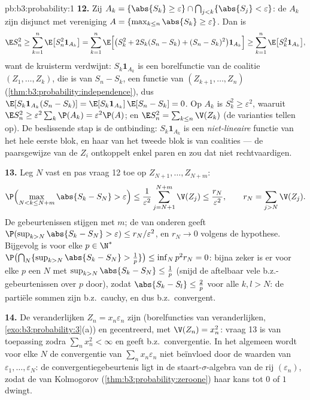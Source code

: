 \begin{solution}{pb:b3:probability:1}
\textbf{12.} Zij $A_k = \{\abs{S_k} \geq \varepsilon\} \cap
\bigcap_{j<k}\{\abs{S_j} < \varepsilon\}$: de $A_k$ zijn disjunct
met vereniging $A = \{\max_{k\leq n}\abs{S_k} \geq
\varepsilon\}$. Dan is
\[
\E S_n^2 \geq \sum_{k=1}^n\E\bigl[S_n^2\mathbf 1_{A_k}\bigr]
= \sum_{k=1}^n\E\Bigl[\bigl(S_k^2 + 2S_k(S_n - S_k) + (S_n
- S_k)^2\bigr)\mathbf 1_{A_k}\Bigr]
\geq \sum_{k=1}^n\E\bigl[S_k^2\mathbf 1_{A_k}\bigr],
\]
want de kruisterm verdwijnt: $S_k\mathbf 1_{A_k}$ is een
borelfunctie van de coalitie $(Z_1, \dots, Z_k)$, die
 is van $S_n - S_k$, een functie van $(Z_{k+1},
\dots, Z_n)$ (\cref{thm:b3:probability:independence}), dus
$\E[S_k\mathbf 1_{A_k}(S_n - S_k)] = \E[S_k\mathbf
1_{A_k}]\,\E[S_n - S_k] = 0$. Op $A_k$ is $S_k^2 \geq
\varepsilon^2$, waaruit $\E S_n^2 \geq
\varepsilon^2\sum_k\P(A_k) = \varepsilon^2\P(A)$; en $\E S_n^2 =
\sum_{k\leq n}\V(Z_k)$ (de varianties tellen op). De beslissende
stap is de ontbinding: $S_k\mathbf 1_{A_k}$ is een
\emph{niet-lineaire} functie van het hele eerste blok, en haar
 van het tweede blok is  van
coalities --- de paarsgewijze  van de $Z_i$
ontkoppelt enkel paren en zou dat niet rechtvaardigen.

\textbf{13.} Leg $N$ vast en pas vraag 12 toe op $Z_{N+1}, \dots,
Z_{N+m}$:
\[
\P\Bigl(\max_{N < k \leq N+m}\abs{S_k - S_N} >
\varepsilon\Bigr) \leq
\frac1{\varepsilon^2}\sum_{j=N+1}^{N+m}\V(Z_j) \leq
\frac{r_N}{\varepsilon^2},
\qquad r_N = \sum_{j>N}\V(Z_j) .
\]
De gebeurtenissen stijgen met $m$; de  van onderen
geeft $\P(\sup_{k>N}\abs{S_k - S_N} > \varepsilon) \leq
r_N/\varepsilon^2$, en $r_N \to 0$ volgens de hypothese.
Bijgevolg is voor elke $p \in \N^*$
$\P\bigl(\bigcap_N\{\sup_{k>N} \abs{S_k - S_N} >
\frac1p\}\bigr) \leq \inf_Np^2r_N = 0$: bijna zeker is er voor
elke $p$ een $N$ met $\sup_{k>N}\abs{S_k - S_N} \leq \frac1p$
(snijd de aftelbaar vele b.z.-gebeurtenissen over $p$ door),
zodat $\abs{S_k - S_l} \leq \frac2p$ voor alle $k, l > N$: de
partiële sommen zijn b.z.\ cauchy, en dus b.z.\ convergent.

\textbf{14.} De veranderlijken $Z_n = x_n\varepsilon_n$ zijn
 (borelfuncties van  veranderlijken,
\cref{exo:b3:probability:3}(a)) en gecentreerd, met $\V(Z_n) =
x_n^2$: vraag 13 is van toepassing zodra $\sum_nx_n^2 < \infty$
en geeft b.z.\ convergentie. In het algemeen wordt voor elke $N$
de convergentie van $\sum_nx_n\varepsilon_n$ niet beïnvloed door
de waarden van $\varepsilon_1, \dots, \varepsilon_N$: de
convergentiegebeurtenis ligt in de staart-$\sigma$-algebra van de
 rij $(\varepsilon_n)$, zodat de  van
Kolmogorov (\cref{thm:b3:probability:zeroone}) haar kans tot $0$
of $1$ dwingt.


\end{solution}
